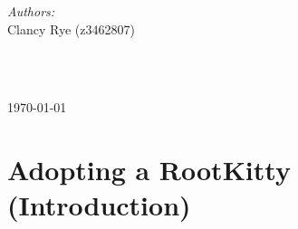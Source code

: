 \documentclass[11pt]{article}
\newenvironment{bottompar}{\par\vspace*{\fill}}{\clearpage} %
\begin{document}
\begin{titlepage}
\begin{bottompar}                %
\begin{minipage}{0.4\textwidth}  %
\begin{flushleft} \large
\emph{Authors:}\\
Clancy Rye (z3462807)    %
\end{flushleft}
\end{minipage}
~                                %
\begin{minipage}{0.4\textwidth}
\begin{flushright} \large        %
\end{flushright}
\end{minipage}\\[1cm]                           %

{\large \today}                  %
\end{bottompar}
\vfill                           %
\end{titlepage}

\tableofcontents                %
\thispagestyle{empty}           %
\newpage

\hypersetup{                                            
    colorlinks, 
    citecolor=blue,
    filecolor=blue,
    linkcolor=blue,
    urlcolor=blue
}

\section{Adopting a RootKitty (Introduction)}
\end{document}
